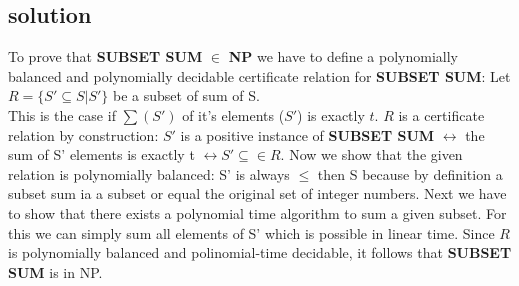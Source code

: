 \subsection{solution}

To prove that \textbf{SUBSET SUM} $\in$ \textbf{NP} we have to define a polynomially balanced and polynomially decidable certificate relation for \textbf{SUBSET SUM}:
\newline
\newline
Let $R=\{S'\subseteq S | S'\}$ be a subset of sum of S. \\
This is the case if $\sum (S')$ of it's elements ($S'$) is exactly $t$.
\newline\newline
$R$ is a certificate relation by construction: $S'$ is a positive instance of \textbf{SUBSET SUM} 
$\leftrightarrow$ the sum of S' elements is exactly t $\leftrightarrow S' \subseteq \in R$.
\newline
\newline
Now we show that the given relation is polynomially balanced:
\newline
S' is always $\leq$ then S because by definition a subset sum ia a subset or equal the 
original set of integer numbers.
\newline
\newline
Next we have to show that there exists a polynomial time algorithm to sum a given subset. 
For this we can simply sum all elements of S' which is possible in linear time.
\newline
\newline
Since $ R $ is polynomially balanced and polinomial-time decidable, it follows that \textbf{SUBSET SUM} is in NP.

